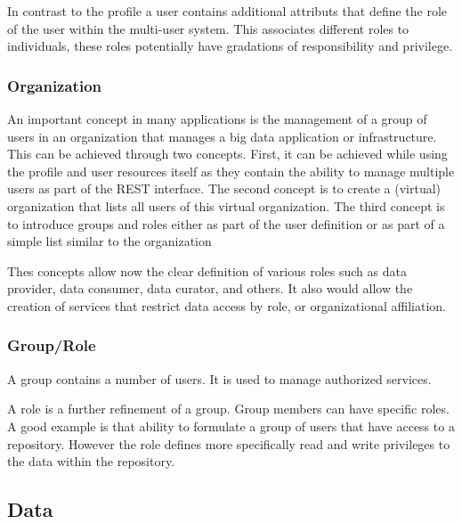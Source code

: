 \documentclass[10pt]{article}
\begin{document}
In contrast to the profile a user contains additional attributs that
define the role of the user within the multi-user system.  This
associates different roles to individuals, these roles potentially
have gradations of responsibility and privilege.


\subsubsection{Organization}

An important concept in many applications is the management of a group
of users in an organization that manages a big data application or
infrastructure. This can be achieved through two concepts. First, it
can be achieved while using the profile and user resources itself as
they contain the ability to manage multiple users as part of the REST
interface. The second concept is to create a (virtual) organization that
lists all users of this virtual organization. The third concept is to
introduce groups and roles either as part of the user definition or as
part of a simple list similar to the organization


Thes concepts allow now the clear definition of various roles such as 
data provider, data consumer, data curator, and others. It also would
allow the creation of services that restrict data access by role, or
organizational affiliation.


\subsubsection{Group/Role}

A group contains a number of users. It is used to manage authorized
services.


A role is a further refinement of a group. Group members can have
specific roles. A good example is that ability to formulate a group of
users that have access to a repository. However the role defines more
specifically read and write privileges to the data within the repository.


\subsection{Data}
\end{document}
